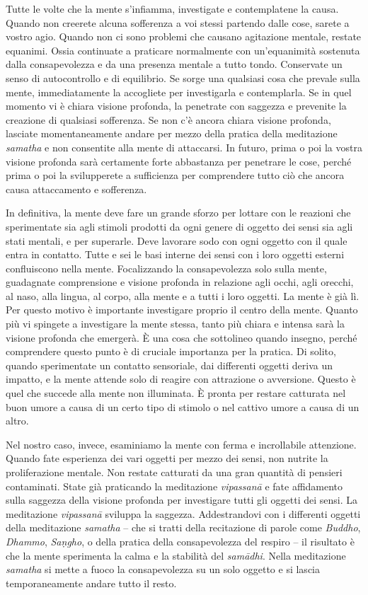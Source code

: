 Tutte le volte che la mente s'infiamma, investigate e contemplatene la
causa. Quando non creerete alcuna sofferenza a voi stessi partendo dalle
cose, sarete a vostro agio. Quando non ci sono problemi che causano
agitazione mentale, restate equanimi. Ossia continuate a praticare
normalmente con un'equanimità sostenuta dalla consapevolezza e da una
presenza mentale a tutto tondo. Conservate un senso di autocontrollo e
di equilibrio. Se sorge una qualsiasi cosa che prevale sulla mente,
immediatamente la accogliete per investigarla e contemplarla. Se in quel
momento vi è chiara visione profonda, la penetrate con saggezza e
prevenite la creazione di qualsiasi sofferenza. Se non c'è ancora chiara
visione profonda, lasciate momentaneamente andare per mezzo della
pratica della meditazione \emph{samatha} e non consentite alla mente di
attaccarsi. In futuro, prima o poi la vostra visione profonda sarà
certamente forte abbastanza per penetrare le cose, perché prima o poi la
svilupperete a sufficienza per comprendere tutto ciò che ancora causa
attaccamento e sofferenza.

In definitiva, la mente deve fare un grande sforzo per lottare con le
reazioni che sperimentate sia agli stimoli prodotti da ogni genere di
oggetto dei sensi sia agli stati mentali, e per superarle. Deve lavorare
sodo con ogni oggetto con il quale entra in contatto. Tutte e sei le
basi interne dei sensi con i loro oggetti esterni confluiscono nella
mente. Focalizzando la consapevolezza solo sulla mente, guadagnate
comprensione e visione profonda in relazione agli occhi, agli orecchi,
al naso, alla lingua, al corpo, alla mente e a tutti i loro oggetti. La
mente è già lì. Per questo motivo è importante investigare proprio il
centro della mente. Quanto più vi spingete a investigare la mente
stessa, tanto più chiara e intensa sarà la visione profonda che
emergerà. È una cosa che sottolineo quando insegno, perché comprendere
questo punto è di cruciale importanza per la pratica. Di solito, quando
sperimentate un contatto sensoriale, dai differenti oggetti deriva un
impatto, e la mente attende solo di reagire con attrazione o avversione.
Questo è quel che succede alla mente non illuminata. È pronta per
restare catturata nel buon umore a causa di un certo tipo di stimolo o
nel cattivo umore a causa di un altro.

Nel nostro caso, invece, esaminiamo la mente con ferma e incrollabile
attenzione. Quando fate esperienza dei vari oggetti per mezzo dei sensi,
non nutrite la proliferazione mentale. Non restate catturati da una gran
quantità di pensieri contaminati. State già praticando la meditazione
\emph{vipassanā} e fate affidamento sulla saggezza della visione
profonda per investigare tutti gli oggetti dei sensi. La meditazione
\emph{vipassanā} sviluppa la saggezza. Addestrandovi con i differenti
oggetti della meditazione \emph{samatha} -- che si tratti della
recitazione di parole come \emph{Buddho}, \emph{Dhammo}, \emph{Saṇgho},
o della pratica della consapevolezza del respiro -- il risultato è che
la mente sperimenta la calma e la stabilità del \emph{samādhi}. Nella
meditazione \emph{samatha} si mette a fuoco la consapevolezza su un solo
oggetto e si lascia temporaneamente andare tutto il resto.

